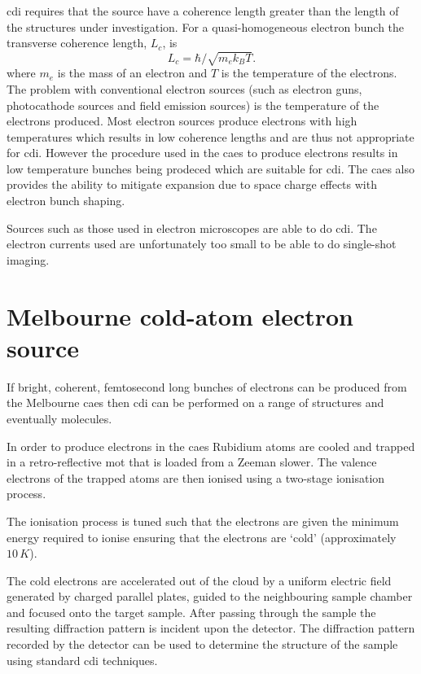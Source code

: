 \Gls{cdi} requires that the source have a coherence length greater than the length of the structures under investigation. For a quasi-homogeneous electron bunch the transverse coherence length, $L_c$, is\cite{van_oudheusden_electron_2007}
\begin{equation}
L_c = \hbar/\sqrt{m_e k_B T}.
\end{equation}
where $m_e$ is the mass of an electron and $T$ is the temperature of the electrons. The problem with conventional electron sources (such as electron guns, photocathode sources and field emission sources) is the temperature of the electrons produced. Most electron sources produce electrons with high temperatures which results in low coherence lengths and are thus not appropriate for \gls{cdi}. However the procedure used in the \gls{caes} to produce electrons results in low temperature bunches being prodeced which are suitable for \gls{cdi}. The \gls{caes} also provides the ability to mitigate expansion due to space charge effects with electron bunch shaping\cite{mcculloch_arbitrarily_2011}.

Sources such as those used in electron microscopes are able to do \gls{cdi}. The electron currents used are unfortunately too small to be able to do single-shot imaging.

\section{Melbourne cold-atom electron source}

If bright, coherent, femtosecond long bunches of electrons can be produced from the Melbourne \gls{caes} then \gls{cdi} can be performed on a range of structures and eventually molecules.

In order to produce electrons in the \gls{caes} Rubidium atoms are cooled and trapped in a retro-reflective \gls{mot} that is loaded from a Zeeman slower\cite{phillips_laser_1982, phillips_cooling_1987, bell_slow_2010}. The valence electrons of the trapped atoms are then ionised using a two-stage ionisation process.

The ionisation process is tuned such that the electrons are given the minimum energy required to ionise ensuring that the electrons are `cold' (approximately $10\,\unit{K}$\cite{mcculloch_arbitrarily_2011}).

The cold electrons are accelerated out of the cloud by a uniform electric field generated by charged parallel plates, guided to the neighbouring sample chamber and focused onto the target sample. After passing through the sample the resulting diffraction pattern is incident upon the detector. The diffraction pattern recorded by the detector can be used to determine the structure of the sample using standard \gls{cdi} techniques.

